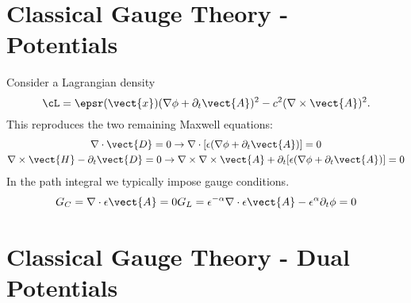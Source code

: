 
\section{Classical Gauge Theory - Potentials}

Consider a Lagrangian density
\begin{equation}
  \cL = \epsr(\vect{x})(\nabla\phi+\partial_t\vect{A})^2-c^2(\nabla\times\vect{A})^2.
\end{equation}
This reproduces the two remaining Maxwell equations:
\begin{gather}
  \nabla\cdot\vect{D} = 0\rightarrow \nabla\cdot[\epsilon(\nabla\phi+\partial_t\vect{A})]=0\\
  \nabla\times\vect{H} - \partial_t\vect{D} = 0
  \rightarrow \nabla\times\nabla\times\vect{A} + \partial_t[\epsilon(\nabla\phi+\partial_t\vect{A})]=0
\end{gather}
In the path integral we typically impose gauge conditions.  
\begin{align}
  G_C = \nabla\cdot\epsilon\vect{A} = 0
  G_L = \epsilon^{-\alpha}\nabla\cdot\epsilon\vect{A} -\epsilon^\alpha\partial_t\phi= 0
\end{align}


\section{Classical Gauge Theory - Dual Potentials}




